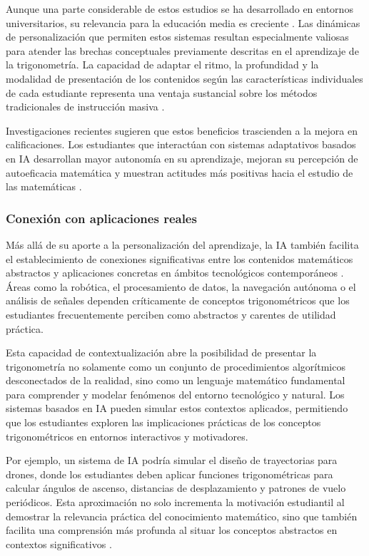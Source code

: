 Aunque una parte considerable de estos estudios se ha desarrollado en entornos universitarios, su relevancia para la educación media es creciente \parencite{parrasanchezPersonalizacionRecursosPara2023}. Las dinámicas de personalización que permiten estos sistemas resultan especialmente valiosas para atender las brechas conceptuales previamente descritas en el aprendizaje de la trigonometría. La capacidad de adaptar el ritmo, la profundidad y la modalidad de presentación de los contenidos según las características individuales de cada estudiante representa una ventaja sustancial sobre los métodos tradicionales de instrucción masiva \parencite{panquebanInteligenciaArtificialEducacion2024}. 

Investigaciones recientes sugieren que estos beneficios trascienden a la mejora en calificaciones. Los estudiantes que interactúan con sistemas adaptativos basados en IA desarrollan mayor autonomía en su aprendizaje, mejoran su percepción de autoeficacia matemática y muestran actitudes más positivas hacia el estudio de las matemáticas \parencite{kuoDevelopingAILearning2026,yaseenImpactAdaptiveLearning2025}.


\subsubsection{Conexión con aplicaciones reales}

Más allá de su aporte a la personalización del aprendizaje, la IA también facilita el establecimiento de conexiones significativas entre los contenidos matemáticos abstractos y aplicaciones concretas en ámbitos tecnológicos contemporáneos \parencite{caoElucidatingSTEMConcepts2023}. Áreas como la robótica, el procesamiento de datos, la navegación autónoma o el análisis de señales dependen críticamente de conceptos trigonométricos que los estudiantes frecuentemente perciben como abstractos y carentes de utilidad práctica.

Esta capacidad de contextualización abre la posibilidad de presentar la trigonometría no solamente como un conjunto de procedimientos algorítmicos desconectados de la realidad, sino como un lenguaje matemático fundamental para comprender y modelar fenómenos del entorno tecnológico y natural. Los sistemas basados en IA pueden simular estos contextos aplicados, permitiendo que los estudiantes exploren las implicaciones prácticas de los conceptos trigonométricos en entornos interactivos y motivadores.

Por ejemplo, un sistema de IA podría simular el diseño de trayectorias para drones, donde los estudiantes deben aplicar funciones trigonométricas para calcular ángulos de ascenso, distancias de desplazamiento y patrones de vuelo periódicos. Esta aproximación no solo incrementa la motivación estudiantil al demostrar la relevancia práctica del conocimiento matemático, sino que también facilita una comprensión más profunda al situar los conceptos abstractos en contextos significativos \parencite{yeungIntegratingDroneTechnology2025}.

